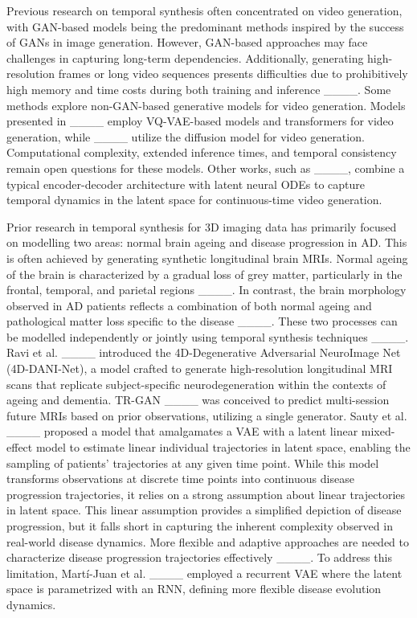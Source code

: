 
Previous research on temporal synthesis often concentrated on video generation, with GAN-based models being the predominant methods inspired by the success of GANs in image generation. However, GAN-based approaches may face challenges in capturing long-term dependencies. Additionally, generating high-resolution frames or long video sequences presents difficulties due to prohibitively high memory and time costs during both training and inference ____. Some methods explore non-GAN-based generative models for video generation. Models presented in ____ employ VQ-VAE-based models and transformers for video generation, while ____ utilize the diffusion model for video generation. Computational complexity, extended inference times, and temporal consistency remain open questions for these models. Other works, such as ____, combine a typical encoder-decoder architecture with latent neural ODEs to capture temporal dynamics in the latent space for continuous-time video generation. 

Prior research in temporal synthesis for 3D imaging data has primarily focused on modelling two areas: normal brain ageing and disease progression in AD. This is often achieved by generating synthetic longitudinal brain MRIs. Normal ageing of the brain is characterized by a gradual loss of grey matter, particularly in the frontal, temporal, and parietal regions ____. In contrast, the brain morphology observed in AD patients reflects a combination of both normal ageing and pathological matter loss specific to the disease ____. These two processes can be modelled independently or jointly using temporal synthesis techniques ____. Ravi et al. ____ introduced the 4D-Degenerative Adversarial NeuroImage Net (4D-DANI-Net), a model crafted to generate high-resolution longitudinal MRI scans that replicate subject-specific neurodegeneration within the contexts of ageing and dementia. TR-GAN ____ was conceived to predict multi-session future MRIs based on prior observations, utilizing a single generator. Sauty et al. ____ proposed a model that amalgamates a VAE with a latent linear mixed-effect model to estimate linear individual trajectories in latent space, enabling the sampling of patients’ trajectories at any given time point. While this model transforms observations at discrete time points into continuous disease progression trajectories, it relies on a strong assumption about linear trajectories in latent space. This linear assumption provides a simplified depiction of disease progression, but it falls short in capturing the inherent complexity observed in real-world disease dynamics. More flexible and adaptive approaches are needed to characterize disease progression trajectories effectively ____. To address this limitation, Martí-Juan et al. ____ employed a recurrent VAE where the latent space is parametrized with an RNN, defining more flexible disease evolution dynamics.

